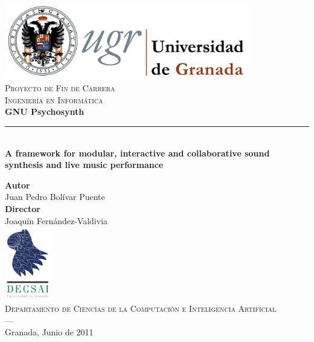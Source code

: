 
\begin{titlepage}
  \newlength{\centeroffset}
  \setlength{\centeroffset}{-0.5\oddsidemargin}
  \addtolength{\centeroffset}{0.5\evensidemargin}
  \thispagestyle{empty}


  \begin{minipage}{\textwidth}  
    \centering
    \includegraphics[width=0.8\textwidth]{pic/logo-ugr.png}\\[1cm]

    \textsc{\Large Proyecto de Fin de Carrera\\%
    }
    \textsc{Ingeniería en Informática}\\[0.5cm]
    
    {\Huge\bfseries\sffamily GNU Psychosynth}
    \noindent\rule[-1ex]{\textwidth}{3pt}\\[2.5ex]
    {\large\bfseries 
      A framework for modular, interactive and collaborative sound
      synthesis and live music performance}
  \end{minipage}

  \vspace{1cm}

  \begin{minipage}{\textwidth}
    \centering
    \textbf{Autor}\\ {Juan Pedro Bolívar Puente}\\%
    \textbf{Director}\\
    {Joaquín Fernández-Valdivia}\\[0.5cm]
    \includegraphics[width=0.15\textwidth]{pic/logo-decsai.png}\\%
    \textsc{Departamento de Ciencías de la Computación e Inteligencia Artificial}\\
    \textsc{---}\\
    Granada, Junio de 2011
  \end{minipage}


\end{titlepage}

